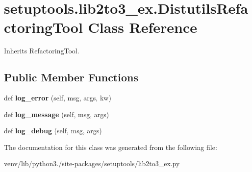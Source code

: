 \hypertarget{classsetuptools_1_1lib2to3__ex_1_1_distutils_refactoring_tool}{}\section{setuptools.\+lib2to3\+\_\+ex.\+Distutils\+Refactoring\+Tool Class Reference}
\label{classsetuptools_1_1lib2to3__ex_1_1_distutils_refactoring_tool}


Inherits Refactoring\+Tool.

\subsection*{Public Member Functions}
\begin{DoxyCompactItemize}
\item 
\mbox{\label{classsetuptools_1_1lib2to3__ex_1_1_distutils_refactoring_tool_afab7dd5ab0853f37be028101f5615e63}} 
def {\bfseries log\+\_\+error} (self, msg, args, kw)
\item 
\mbox{\label{classsetuptools_1_1lib2to3__ex_1_1_distutils_refactoring_tool_abd4e41a1094e843d498e86b9a48e4872}} 
def {\bfseries log\+\_\+message} (self, msg, args)
\item 
\mbox{\label{classsetuptools_1_1lib2to3__ex_1_1_distutils_refactoring_tool_a64caed9a054319ad50eff6a7eaec85fd}} 
def {\bfseries log\+\_\+debug} (self, msg, args)
\end{DoxyCompactItemize}


The documentation for this class was generated from the following file\+:\begin{DoxyCompactItemize}
\item 
venv/lib/python3./site-\/packages/setuptools/lib2to3\+\_\+ex.\+py\end{DoxyCompactItemize}
